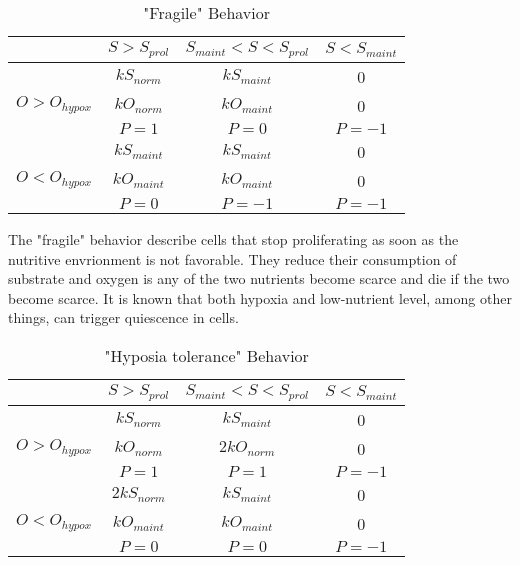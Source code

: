 \documentclass[11pt,a4paper]{article}
\begin{document}
\begin{table}[h!]
\begin{center}
\begin{tabular}{ |c|c|c|c| }
\hline
 & \textbf{$S>S_{prol}$} & \textbf{$S_{maint}<S<S_{prol}$} & \textbf{$S<S_{maint}$} \\
\hline
 & $kS_{norm}$    &  $kS_{maint}$   & 0  \\
$O> O_{hypox}$ &  $kO_{norm}$   & $kO_{maint}$ &  0 \\
 &  $P = 1$ & $P = 0$ & $P=-1$ \\
\hline
  & $kS_{maint}$ & $kS_{maint}$ & 0 \\
$O< O_{hypox}$ & $kO_{maint}$ & $kO_{maint}$ & 0 \\
 & $P=0$  & $P=-1$ & $P=-1$ \\
\hline
\end{tabular}
\caption{"Fragile" Behavior \label{fragile}}
\end{center}
\end{table}

The "fragile" behavior describe cells that stop proliferating as soon as the nutritive envrionment is not favorable. They reduce their consumption of substrate and oxygen is  any of the two nutrients become scarce and die if the two become scarce. It is known that both hypoxia and low-nutrient level, among other things, can trigger quiescence in cells.\cite{Valcourt2012}\cite{Nabil2021}\\

\begin{table}[h!]
\begin{center}
\begin{tabular}{ |c|c|c|c| }
\hline
 & \textbf{$S>S_{prol}$} & \textbf{$S_{maint}<S<S_{prol}$} & \textbf{$S<S_{maint}$} \\
\hline
 & $kS_{norm}$    &  $kS_{maint}$   & 0  \\
$O> O_{hypox}$ &  $kO_{norm}$   & $2kO_{norm}$ &  0 \\
 &  $P = 1$ & $P = 1$ & $P=-1$ \\
\hline
  & $2kS_{norm}$ & $kS_{maint}$ & 0 \\
$O< O_{hypox}$ & $kO_{maint}$ & $kO_{maint}$ & 0 \\
 & $P=0$  & $P=0$ & $P=-1$ \\
\hline
\end{tabular}
\caption{"Hyposia tolerance" Behavior }
\end{center}
\end{table}
\end{document}
